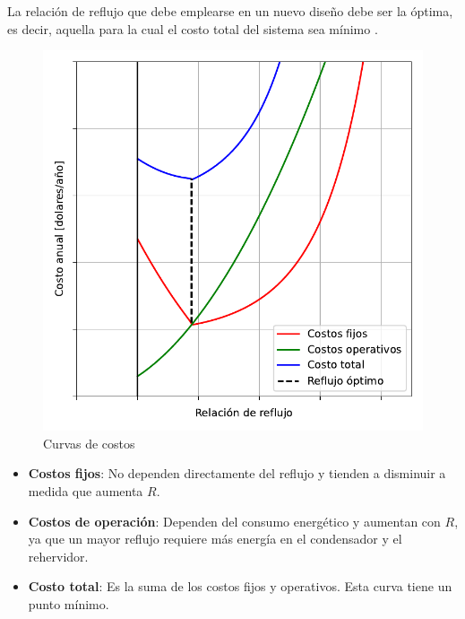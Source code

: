 La relación de reflujo que debe emplearse en un nuevo diseño debe ser la óptima, es decir, aquella para la cual el costo total del sistema sea mínimo \parencite{subsec5_5ref2}.

\begin{figure}[ht]
    \centering
    \caption{Curvas de costos}
    \includegraphics[width=0.4\linewidth]{../resources/images/reflujo_optimo.pdf}
\end{figure}

\begin{itemize}
    \item \textbf{Costos fijos}: No dependen directamente del reflujo y tienden a disminuir a medida que aumenta $R$.
    \item \textbf{Costos de operación}: Dependen del consumo energético y aumentan con $R$, ya que un mayor reflujo requiere más energía en el condensador y el rehervidor.
    \item \textbf{Costo total}: Es la suma de los costos fijos y operativos. Esta curva tiene un punto mínimo.
\end{itemize}

\newpage
